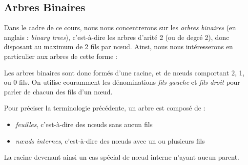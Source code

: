 \documentclass[11pt,a4paper]{article}
\begin{document}
\subsection{Arbres Binaires}

Dans le cadre de ce cours, nous nous concentrerons sur les \textit{arbres binaires} (en anglais : \textit{binary trees}), c'est-à-dire les arbres d'arité 2 (ou de degré 2), donc disposant au maximum de 2 fils par nœud.
%
Ainsi, nous nous intéresserons en particulier aux arbres de cette forme :

\begin{center}
\end{center}


Les arbres binaires sont donc formés d'une racine, et de nœuds comportant 2, 1, ou 0 fils.
On utilise couramment les dénominations \textit{fils gauche} et \textit{fils droit} pour parler de chacun des fils d'un nœud.

\medskip

Pour préciser la terminologie précédente, un arbre est composé de :
\begin{itemize}
\item \textit{feuilles}, c'est-à-dire des nœuds sans aucun fils
\item \textit{nœuds internes}, c'est-à-dire des nœuds avec un ou plusieurs fils
\end{itemize}

La racine devenant ainsi un cas spécial de nœud interne n'ayant aucun parent.


\pagebreak
\end{document}
